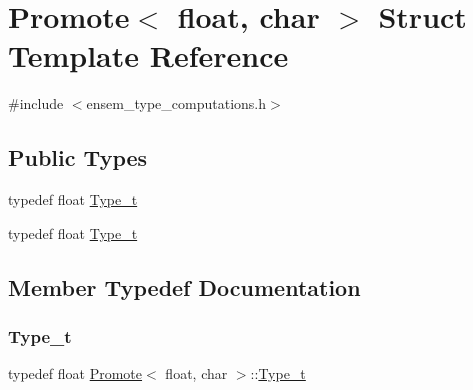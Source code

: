 \hypertarget{structPromote_3_01float_00_01char_01_4}{}\section{Promote$<$ float, char $>$ Struct Template Reference}
\label{structPromote_3_01float_00_01char_01_4}


{\ttfamily \#include $<$ensem\+\_\+type\+\_\+computations.\+h$>$}

\subsection*{Public Types}
\begin{DoxyCompactItemize}
\item 
typedef float \mbox{\hyperlink{structPromote_3_01float_00_01char_01_4_a9eacd1e5cdca40ea6e663825796599fc}{Type\+\_\+t}}
\item 
typedef float \mbox{\hyperlink{structPromote_3_01float_00_01char_01_4_a9eacd1e5cdca40ea6e663825796599fc}{Type\+\_\+t}}
\end{DoxyCompactItemize}


\subsection{Member Typedef Documentation}
\mbox{\label{structPromote_3_01float_00_01char_01_4_a9eacd1e5cdca40ea6e663825796599fc}} 
\subsubsection{\texorpdfstring{Type\_t}{Type\_t}\hspace{0.1cm}{\footnotesize\ttfamily [1/2]}}
{\footnotesize\ttfamily typedef float \mbox{\hyperlink{structPromote}{Promote}}$<$ float, char $>$\+::\mbox{\hyperlink{structPromote_3_01float_00_01char_01_4_a9eacd1e5cdca40ea6e663825796599fc}{Type\+\_\+t}}}

\mbox{\label{structPromote_3_01float_00_01char_01_4_a9eacd1e5cdca40ea6e663825796599fc}} 
